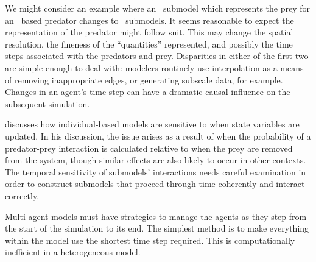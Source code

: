 We might consider an example where an \SD\ sub\-model which represents
the prey for an \SD\ based predator changes to \IB\ sub\-models. It
seems reasonable to expect the rep\-re\-sen\-ta\-tion of the predator might
follow suit. This may change the spatial resolution, the fineness of
the ``quantities'' represented, and possibly the time steps associated
with the predators and prey. Disparities in either of the first two
are simple enough to deal with: modelers routinely use interpolation
as a means of removing inappropriate edges, or generating subscale
data, for example.  Changes in an agent's time step can have a
dramatic causal influence on the subsequent simulation.

\Cite{chivers2009generalised} discusses how in\-di\-vidu\-al-based models
are sen\-si\-tive to when state variables are updated.  In his discussion,
the issue arises as a result of when the probability of a
predator-prey in\-ter\-ac\-tion is cal\-cu\-la\-ted relative to when the prey are
re\-moved from the system, though sim\-i\-lar effects are also likely to
oc\-cur in other con\-texts. The temporal sen\-si\-tiv\-i\-ty of sub\-models'
interactions needs careful examination in order to construct sub\-models
that proceed through time coherently and interact correctly.

Multi-agent models must have strategies to manage the agents as they
step from the start of the simulation to its end.  The simplest method
is to make everything within the model use the shortest time step
required.  This is computationally inefficient in a heterogeneous
model.

